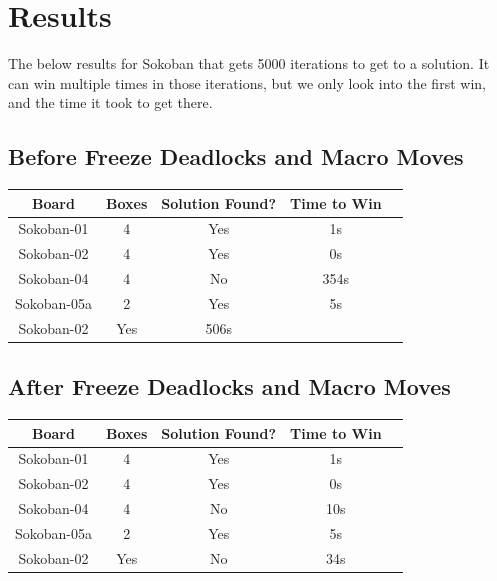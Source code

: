 \documentclass{article}
\begin{document}
\section{Results}
The below results for Sokoban that gets 5000 iterations to get to a solution. It can win multiple times in those iterations, but we only look into the first win, and the time it took to get there. 

\subsection{Before Freeze Deadlocks and Macro Moves}
\begin{center}
\vspace{-5pt}
\footnotesize
\begin{tabular}{|c|c|c|c|c|}
    \hline
    Board & Boxes & Solution Found? & Time to Win\\
    \hline
    Sokoban-01 & 4 & Yes & 1s\\
    \hline
    Sokoban-02 & 4 & Yes & 0s\\
    \hline
    Sokoban-04 & 4 & No & 354s \\
    \hline
    Sokoban-05a & 2 & Yes & 5s\\
    \hline
    Sokoban-02 & Yes & 506s\\
    \hline
\end{tabular}
\vspace{-5pt}
\end{center}

\subsection{After Freeze Deadlocks and Macro Moves}
\begin{center}
\vspace{-5pt}
\footnotesize
\begin{tabular}{|c|c|c|c|c|}
    \hline
    Board & Boxes & Solution Found? & Time to Win\\
    \hline
    Sokoban-01 & 4 & Yes & 1s\\
    \hline
    Sokoban-02 & 4 & Yes & 0s\\
    \hline
    Sokoban-04 & 4 & No & 10s \\
    \hline
    Sokoban-05a & 2 & Yes & 5s\\
    \hline
    Sokoban-02 & Yes & No & 34s\\
    \hline
\end{tabular}
\vspace{-5pt}
\end{center}
\end{document}
